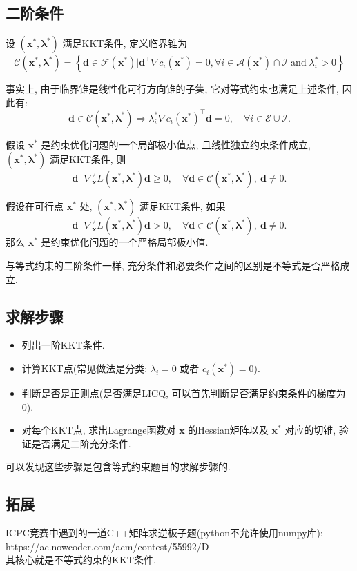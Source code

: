 \documentclass[lang = cn]{elegantpaper}
\begin{document}
\subsection{二阶条件}
\begin{definition}
    设 $(\bm{x}^{*},\bm{\lambda}^{*})$ 满足KKT条件, 定义临界锥为
\begin{equation*}
    \mathcal{C}(\bm{x}^{*},\bm{\lambda}^{*}) = \left\{\bm{d}\in \mathcal{F}(\bm{x}^{*})|\bm{d}^\top\nabla c_i(\bm{x}^{*})=0,\forall i \in \mathcal{A}(\bm{x}^{*}) \cap \mathcal{I}\;\mathrm{and}\;\lambda_i^{*} > 0\right\}
\end{equation*}
\end{definition}
\noindent
事实上, 由于临界锥是线性化可行方向锥的子集, 它对等式约束也满足上述条件, 因此有:
\begin{equation*}
    \bm{d} \in \mathcal{C}(\bm{x}^{*},\bm{\lambda}^{*}) \Rightarrow \lambda_i^{*}\nabla c_i(\bm{x}^{*})^\top \bm{d} = 0,\quad \forall i \in \mathcal{E} \cup \mathcal{I}.
\end{equation*}
\begin{theorem}
    假设 $\bm{x}^{*}$ 是约束优化问题的一个局部极小值点, 且线性独立约束条件成立, $(\bm{x}^{*},\bm{\lambda}^{*})$ 满足KKT条件, 则
\begin{equation*}
    \bm{d}^\top \nabla_{\bm{x}}^2 L(\bm{x}^{*},\bm{\lambda}^{*})\bm{d} \ge 0,\quad \forall\bm{d}\in \mathcal{C}(\bm{x}^{*},\bm{\lambda}^{*}),\: \bm{d} \neq 0.
\end{equation*}
\end{theorem}
\begin{theorem}
    假设在可行点 $\bm{x}^{*}$ 处, $(\bm{x}^{*},\bm{\lambda}^{*})$ 满足KKT条件, 如果
\begin{equation*}
    \bm{d}^\top \nabla_{\bm{x}}^2 L(\bm{x}^{*},\bm{\lambda}^{*})\bm{d} > 0,\quad \forall\bm{d}\in \mathcal{C}(\bm{x}^{*},\bm{\lambda}^{*}),\: \bm{d} \neq 0.
\end{equation*}
    那么 $\bm{x}^{*}$ 是约束优化问题的一个严格局部极小值.
\end{theorem}
\noindent
与等式约束的二阶条件一样, 充分条件和必要条件之间的区别是不等式是否严格成立.
\subsection{求解步骤}
\noindent
\begin{itemize}
    \item 列出一阶KKT条件.
    \item 计算KKT点(常见做法是分类: $\lambda_i = 0$ 或者 $c_i(\bm{x}^{*}) = 0$).
    \item 判断是否是正则点(是否满足LICQ, 可以首先判断是否满足约束条件的梯度为0).
    \item 对每个KKT点, 求出Lagrange函数对 $\bm{x}$ 的Hessian矩阵以及 $\bm{x}^{*}$ 对应的切锥, 验证是否满足二阶充分条件.
\end{itemize}
可以发现这些步骤是包含等式约束题目的求解步骤的.
\subsection{拓展}
\noindent
ICPC竞赛中遇到的一道C++矩阵求逆板子题(python不允许使用numpy库): https://ac.nowcoder.com/acm/contest/55992/D\\
其核心就是不等式约束的KKT条件.
\end{document}
